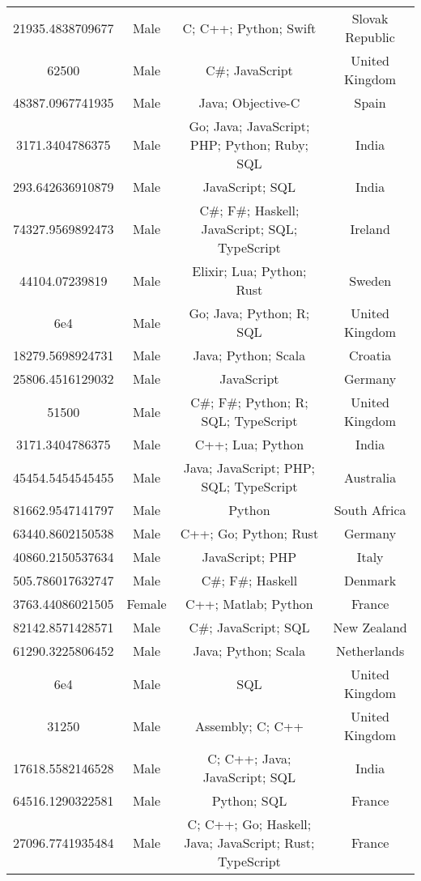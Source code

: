\begin{center}
\begin{tabular}{ |c|c|c|c| }
21935.4838709677  &  Male  &  C; C++; Python; Swift  &  Slovak Republic  \\ 
62500  &  Male  &  C\#; JavaScript  &  United Kingdom  \\ 
48387.0967741935  &  Male  &  Java; Objective-C  &  Spain  \\ 
3171.3404786375  &  Male  &  Go; Java; JavaScript; PHP; Python; Ruby; SQL  &  India  \\ 
293.642636910879  &  Male  &  JavaScript; SQL  &  India  \\ 
74327.9569892473  &  Male  &  C\#; F\#; Haskell; JavaScript; SQL; TypeScript  &  Ireland  \\ 
44104.07239819  &  Male  &  Elixir; Lua; Python; Rust  &  Sweden  \\ 
6e4  &  Male  &  Go; Java; Python; R; SQL  &  United Kingdom  \\ 
18279.5698924731  &  Male  &  Java; Python; Scala  &  Croatia  \\ 
25806.4516129032  &  Male  &  JavaScript  &  Germany  \\ 
51500  &  Male  &  C\#; F\#; Python; R; SQL; TypeScript  &  United Kingdom  \\ 
3171.3404786375  &  Male  &  C++; Lua; Python  &  India  \\ 
45454.5454545455  &  Male  &  Java; JavaScript; PHP; SQL; TypeScript  &  Australia  \\ 
81662.9547141797  &  Male  &  Python  &  South Africa  \\ 
63440.8602150538  &  Male  &  C++; Go; Python; Rust  &  Germany  \\ 
40860.2150537634  &  Male  &  JavaScript; PHP  &  Italy  \\ 
505.786017632747  &  Male  &  C\#; F\#; Haskell  &  Denmark  \\ 
3763.44086021505  &  Female  &  C++; Matlab; Python  &  France  \\ 
82142.8571428571  &  Male  &  C\#; JavaScript; SQL  &  New Zealand  \\ 
61290.3225806452  &  Male  &  Java; Python; Scala  &  Netherlands  \\ 
6e4  &  Male  &  SQL  &  United Kingdom  \\ 
31250  &  Male  &  Assembly; C; C++  &  United Kingdom  \\ 
17618.5582146528  &  Male  &  C; C++; Java; JavaScript; SQL  &  India  \\ 
64516.1290322581  &  Male  &  Python; SQL  &  France  \\ 
27096.7741935484  &  Male  &  C; C++; Go; Haskell; Java; JavaScript; Rust; TypeScript  &  France  \\ 

\end{tabular}
\end{center}
